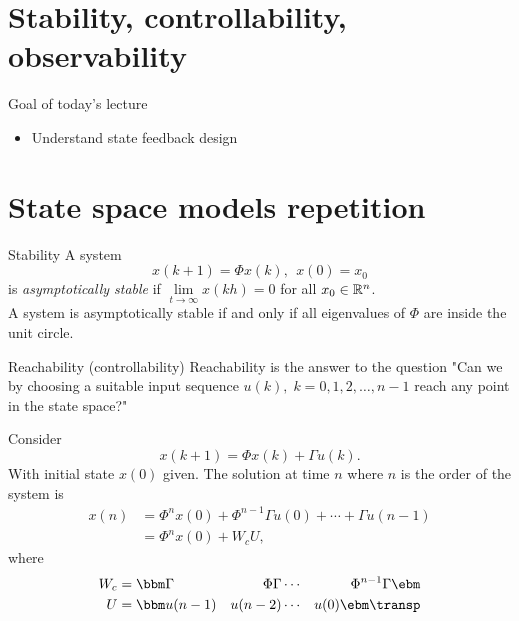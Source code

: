 \documentclass[presentation,aspectratio=1610]{beamer}
\begin{document}
\section{Stability, controllability, observability}
\label{sec:org2434a51}
\begin{frame}[label={sec:org41fe909}]{Goal of today's lecture}
\begin{itemize}
\item Understand state feedback design
\end{itemize}
\end{frame}

\section{State space models repetition}
\label{sec:org030c453}

\begin{frame}[label={sec:orgac3bf38}]{Stability}
A system 
\begin{equation*}
x(k+1)=\Phi x(k), \ \ x(0)=x_0
\end{equation*}
is \emph{asymptotically stable}  if  \(\underset{t\to\infty}{\lim}x(kh)=0\) for all  \(x_0\in\Bbb{R}^n\).\\

A system is asymptotically stable if and only if \alert{all eigenvalues of \(\Phi\) are inside the unit circle.}
\end{frame}

\begin{frame}[label={sec:orga5ee6ab}]{Reachability (controllability)}
Reachability is the answer to the question "Can we by choosing a suitable input sequence \(u(k),\; k=0,1,2,\ldots,n-1\) reach any point in the state space?"

Consider
\[ x(k+1) = \Phi x(k) + \Gamma u(k). \]
With initial state \(x(0)\) given. The solution at time \(n\) where \(n\) is the order of the system is
\begin{equation}
\begin{split}
x(n) &= \Phi^nx(0) + \Phi^{n-1}\Gamma u(0) + \cdots + \Gamma u(n-1)\\
     &= \Phi^nx(0) + W_c U, 
\end{split}
\end{equation}
where
\begin{align*}
W_c &= \bbm \Gamma & \Phi\Gamma & \cdots & \Phi^{n-1}\Gamma\ebm\\
U &= \bbm u(n-1) & u(n-2) & \cdots & u(0) \ebm\transp
\end{align*}
\end{frame}
\end{document}
